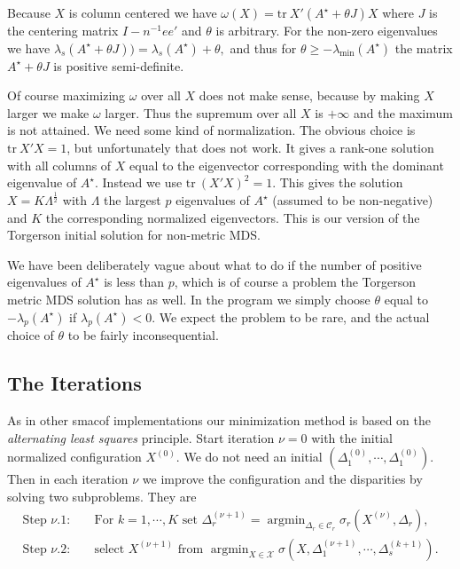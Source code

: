 \documentclass[
  12pt,
]{article}
\begin{document}
Because \(X\) is column centered we have
\(\omega(X)=\text{tr}\ X'(A^\star + \theta J)X\) where \(J\) is the
centering matrix \(I-n^{-1}ee'\) and \(\theta\) is arbitrary. For
the non-zero eigenvalues we have
\(\lambda_s(A^\star + \theta J))=\lambda_s(A^\star) + \theta,\)
and thus for \(\theta\geq-\lambda_{\text{min}}(A^\star)\) the matrix \(A^\star + \theta J\) is positive semi-definite.

Of course maximizing \(\omega\) over all \(X\) does not make sense, because
by making \(X\) larger we make \(\omega\) larger. Thus the supremum over all
\(X\) is \(+\infty\) and the maximum is not attained. We need some
kind of normalization. The obvious choice is \(\text{tr}\ X'X=1\), but
unfortunately that does not work. It gives a rank-one solution
with all columns of \(X\) equal to the eigenvector corresponding with the
dominant eigenvalue of \(A^\star\). Instead we use \(\text{tr}\ (X'X)^2=1\).
This gives the solution \(X=K\Lambda^\frac12\) with \(\Lambda\) the largest \(p\) eigenvalues of \(A^\star\) (assumed to be non-negative) and \(K\) the
corresponding normalized eigenvectors. This is our version of
the Torgerson initial solution for non-metric MDS.

We have been deliberately vague about what to do if the number of
positive eigenvalues of \(A^\star\) is less than \(p\), which is of
course a problem the Torgerson metric MDS solution has as well. In the
program we simply choose \(\theta\) equal to \(-\lambda_p(A^\star)\)
if \(\lambda_p(A^\star)<0\). We expect the problem to be rare, and
the actual choice of \(\theta\) to be fairly inconsequential.

\subsection{The Iterations}\label{the-iterations}

As in other smacof implementations our minimization method is based on the
\emph{alternating least squares} principle. Start
iteration \(\nu=0\) with the initial normalized configuration \(X^{(0)}\). We do not need an initial \((\Delta_1^{(0)},\cdots,\Delta_1^{(0)})\). Then in each iteration \(\nu\) we improve the configuration and the disparities by solving two subproblems. They are
\begin{align}
\text{Step  }\nu.1:\quad&\text{For }k=1,\cdots,K\text{ set } \Delta_r^{(\nu+1)}=\mathop{\text{argmin}}_{\Delta_r\in\mathcal{C}_r}\sigma_r(X^{(\nu)},\Delta_r),\label{eq:alsprob1}\\
\text{Step  }\nu.2:\quad&\text{select }X^{(\nu+1)}\text{ from }\mathop{\text{argmin}}_{X\in\mathcal{X}}\sigma(X,\Delta_1^{(\nu+1)},\cdots,\Delta_s^{(k+1)}).\label{eq:alsprob2}
\end{align}
\end{document}

